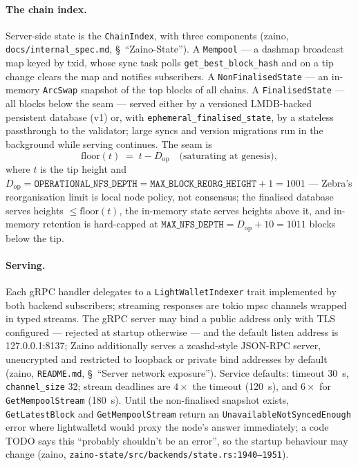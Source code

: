 \documentclass[11pt,a4paper]{article}
\theoremstyle{definition}
\begin{document}
\paragraph{The chain index.} Server-side state is the
\texttt{ChainIndex}, with three components (\textsf{zaino},
\texttt{docs/\allowbreak internal\_spec.md}, \S~``Zaino-State''). A
\texttt{Mempool}
--- a dashmap broadcast map keyed by txid, whose sync task polls
\texttt{get\_best\_block\_hash} and on a tip change clears the map and
notifies subscribers. A
\texttt{NonFinalisedState} --- an in-memory \texttt{ArcSwap} snapshot of
the top blocks of all chains. A \texttt{FinalisedState} --- all blocks
below the seam --- served either by a versioned LMDB-backed persistent
database (v1) or, with \texttt{ephemeral\_finalised\_state}, by a
stateless passthrough to the validator; large syncs and version
migrations run in the background while serving continues. The seam
is
\[
\mathrm{floor}(t) \;=\; t - D_{\mathrm{op}}
\quad\text{(saturating at genesis)},
\]
where $t$ is the tip height and
$D_{\mathrm{op}} = \mathtt{OPERATIONAL\_NFS\_DEPTH} =
\mathtt{MAX\_BLOCK\_REORG\_HEIGHT} + 1 = 1001$ --- Zebra's reorganisation
limit is local node policy, not consensus; the finalised database serves
heights $\le \mathrm{floor}(t)$, the in-memory state serves heights above
it, and in-memory retention is hard-capped at
$\mathtt{MAX\_NFS\_DEPTH} = D_{\mathrm{op}} + 10 = 1011$ blocks below the
tip.

\paragraph{Serving.} Each gRPC handler delegates to a
\texttt{LightWalletIndexer} trait implemented by both backend
subscribers; streaming responses are tokio mpsc channels wrapped in typed
streams. The gRPC server
may bind a public address only with TLS configured --- rejected at
startup otherwise --- and the default listen address is 127.0.0.1:8137;
Zaino additionally serves a zcashd-style JSON-RPC server, unencrypted and
restricted to loopback or private bind addresses by default
(\textsf{zaino}, \texttt{README.md}, \S~``Server network exposure'').
Service defaults: timeout 30~s,
\texttt{channel\_size} 32; stream deadlines are $4\times$ the timeout
(120~s), and $6\times$ for \texttt{GetMempoolStream} (180~s).
Until the non-finalised snapshot exists, \texttt{GetLatestBlock} and
\texttt{GetMempoolStream} return an \texttt{UnavailableNotSyncedEnough}
error where lightwalletd would proxy the node's answer immediately; a
code TODO says this ``probably shouldn't be an error'', so the startup
behaviour may change (\textsf{zaino},
\texttt{zaino-state/src/backends/state.rs:1940--1951}).
\end{document}
